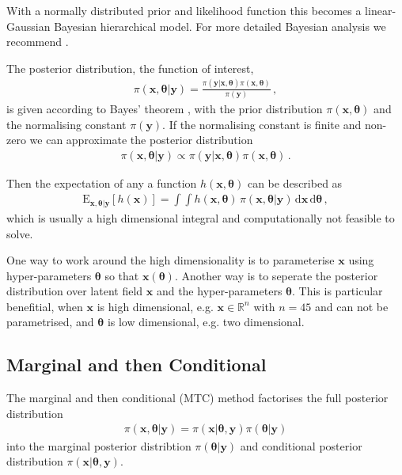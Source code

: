 With a normally distributed prior and likelihood function this becomes a linear-Gaussian Bayesian hierarchical model.
For more detailed Bayesian analysis we recommend \cite{}.

The posterior distribution, the function of interest,
\begin{align}
	\pi(\bm{x},\bm{\theta}|\bm{y}) = \frac{ \pi(\bm{y} | \bm{x}, \bm{\theta} ) \pi(\bm{x}, \bm{\theta})}{\pi(\bm{y})} \, ,
\end{align}
is given according to Bayes' theorem \cite{}, with the prior distribution $\pi(\bm{x}, \bm{\theta})$ and the normalising constant $\pi(\bm{y})$.
If the normalising constant is finite and non-zero we can approximate the posterior distribution
\begin{align}
	\pi(\bm{x},\bm{\theta}|\bm{y}) \propto \pi(\bm{y} | \bm{x}, \bm{\theta} ) \pi(\bm{x}, \bm{\theta}) \, .
\end{align}

Then the expectation of any a function $h(\bm{x},\bm{\theta})$ can be described as 
\begin{align}
	\text{E}_{\bm{x},\bm{\theta}|\bm{y}} [h(\bm{x})] =  \int \int   h(\bm{x},\bm{\theta}) \,  \pi(\bm{x}, \bm{\theta} | \bm{y} ) \, \text{d} \bm{x}  \, \text{d} \bm{\theta}   \label{eq:expPos} \, ,
\end{align}
which is usually a high dimensional integral and computationally not feasible to solve.

One way to work around the high dimensionality is to parameterise $\bm{x}$ using hyper-parameters $\bm{\theta}$ so that $\bm{x}(\bm{\theta})$. 
Another way is to seperate the posterior distribution over latent field $\bm{x}$ and the hyper-parameters $\bm{\theta}$.
This is particular benefitial, when $\bm{x}$ is high dimensional, e.g. $\bm{x} \in \mathbb{R}^n$ with $n = 45$ and can not be parametrised, and $\bm{\theta}$ is low dimensional, e.g. two dimensional.


\subsection{Marginal and then Conditional}
The marginal and then conditional (MTC) method factorises the full posterior distribution 
\begin{align}
	\pi(\bm{x}, \bm{\theta}|\bm{y}) = \pi(\bm{x}| \bm{\theta}, \bm{y}) \pi(\bm{\theta}|\bm{y})
\end{align}
into the marginal posterior distribtion $ \pi(\bm{\theta}|\bm{y})$ and conditional posterior distribution $\pi(\bm{x}| \bm{\theta}, \bm{y})$.


